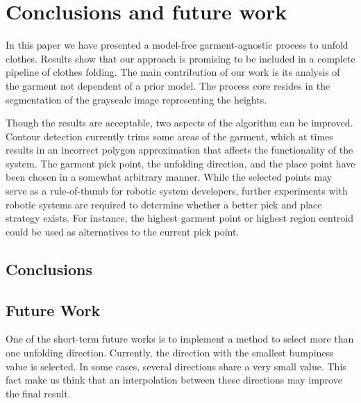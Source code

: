 \chapter{Conclusions and future work}
\label{conclusions_and_future_work}

In this paper we have presented a model-free garment-agnostic process to unfold clothes. Results show that our approach is promising to be included in a complete pipeline of clothes folding. The main contribution of our work is its analysis of the garment not dependent of a prior model. The process core resides in the segmentation of the grayscale image representing the heights.

Though the results are acceptable, two aspects of the algorithm can be improved.
Contour detection currently trims some areas of the garment, which at times results in an incorrect polygon approximation that affects the functionality of the system.
The garment pick point, the unfolding direction, and the place point have been chosen in a somewhat arbitrary manner. While the selected points may serve as a rule-of-thumb for robotic system developers, further experiments with robotic systems are required to determine whether a better pick and place strategy exists. For instance, the highest garment point or highest region centroid could be used as alternatives to the current pick point.

\section{Conclusions}
\label{conclusions}

\section{Future Work}
\label{future_work}
One of the short-term future works is to implement a method to select more than one unfolding direction. Currently, the direction with the smallest bumpiness value is selected. In some cases, several directions share a very small value. This fact make us think that an interpolation between these directions may improve the final result. 